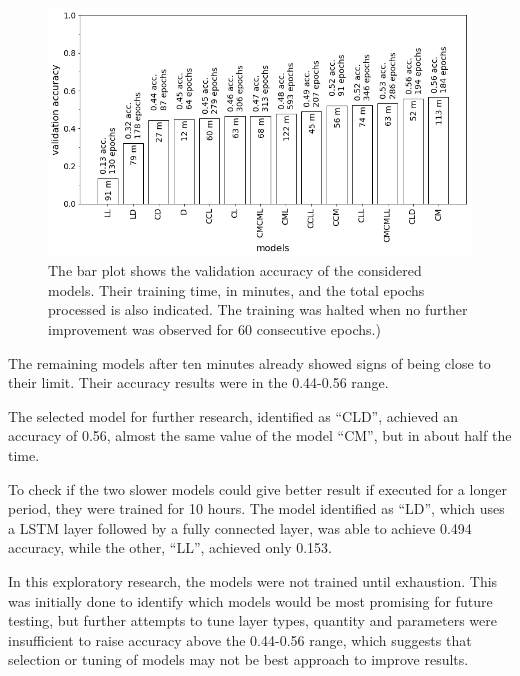 \noindent
\begin{figure}[htb!]
\centering\includegraphics[width=1.0\textwidth]{content/models.png}
\caption{\label{fig:models}The bar plot shows the validation accuracy of the considered models. Their training time, in minutes, and the total epochs processed is also indicated. The training was halted when no further improvement was observed for 60 consecutive epochs.)}%
\end{figure}



The remaining models after ten minutes already showed signs of being close to their limit.
Their accuracy results were in the 0.44-0.56 range.

The selected model for further research, identified as ``CLD'', achieved an accuracy of 0.56, almost the same value of the model ``CM'', but in about half the time.

To check if the two slower models could give better result if executed for a longer period, they were trained for 10 hours. The model identified as ``LD'', which uses a LSTM layer followed by a fully connected layer, was able to achieve 0.494 accuracy, while the other, ``LL'', achieved only 0.153.




In this exploratory research, the models were not trained until exhaustion. This was initially done to identify which models would be most promising for future testing, but further attempts to tune layer types, quantity and parameters were insufficient to raise accuracy above the 0.44-0.56 range, which suggests that selection or tuning of models may not be best approach to improve results.



